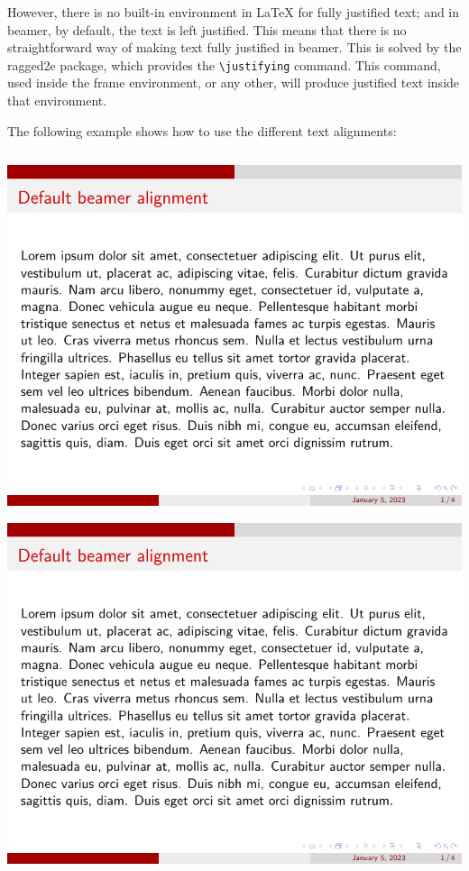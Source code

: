 However, there is no built-in environment in LaTeX for fully justified text; and in beamer, by default, the text is left justified. This means that there is no straightforward way of making text fully justified in beamer. This is solved by the ragged2e package, which provides the \verb|\justifying| command. This command, used inside the frame environment, or any other, will produce justified text inside that environment.

The following example shows how to use the different text alignments:

\inputminted[linenos=true]{latex}{examples/beamer/text-alignment.tex}

\includegraphics[page=1]{examples/beamer/text-alignment.pdf}

\includegraphics[page=2]{examples/beamer/text-alignment.pdf}


